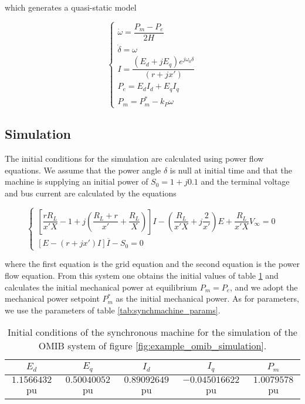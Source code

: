 	\noindent which generates a quasi-static model

\begin{equation}
	\left\{\begin{array}{l}
		\dot{\omega} = \dfrac{P_m - P_e}{2H} \\[5mm]
		\dot{\delta} = \omega \\[5mm]
		I = \dfrac{\left(E_d + jE_q\right)e^{j\omega_0\delta}}{\left(r + jx'\right)} \\[5mm]
		P_e = E_dI_d + E_qI_q \\[5mm]
		P_m = P_m^* - k_P\omega
	\end{array}\right. \label{eq:omib_classical_short_quasistatic}
\end{equation} %

\subsection{Simulation} %

	The initial conditions for the simulation are calculated using power flow equations. We assume that the power angle $\delta$ is null at initial time and that the machine is supplying an initial power of $S_0 = 1 + j0.1$ and the terminal voltage and bus current are calculated by the equations

\begin{equation}
	\left\{\begin{array}{l}
		\left[\dfrac{rR_L}{x'X} - 1 + j\left(\dfrac{R_L + r}{x'} + \dfrac{R_L}{X}\right)\right]I - \left(\dfrac{R_L}{x'X} + j\dfrac{2}{x'}\right)E + \dfrac{R_L}{x'X}V_\infty = 0 \\[5mm]
		\left[E - \left(r + jx'\right)I\right]\overline{I} - S_0 = 0
	\end{array}\right.
\end{equation}

	\noindent where the first equation is the grid equation and the second equation is the power flow equation. From this system one obtains the initial values of table \ref{tab:initialcond_params} and calculates the initial mechanical power at equilibrium $P_m = P_e$, and we adopt the mechanical power setpoint $P_m^*$ as the initial mechanical power. As for parameters, we use the parameters of table \ref{tab:synchmachine_params}.

\renewcommand{\arraystretch}{1.2}
\begin{table}[t]
\begin{center}
\begin{tabular}{ c|c|c|c|c } 
\hline 
\raisebox{-2mm}{} $E_d$ & $E_q$ & $I_d$ & $I_q$ & $P_m$ \\
\hline
$1.1566432$ pu & $0.50040052$ pu & $0.89092649$ pu & $-0.045016622$ pu & $1.0079578$ pu \\
\hline
\end{tabular}
\end{center}
\caption{Initial conditions of the synchronous machine for the simulation of the OMIB system of figure \ref{fig:example_omib_simulation}.}
\label{tab:initialcond_params}
\end{table} %

